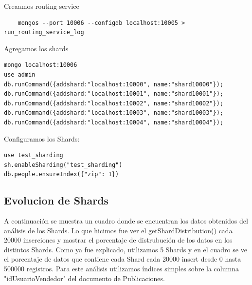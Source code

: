 \documentclass[a4paper, 10pt, twoside]{article}
\begin{document}
Creaamos routing service

\begin{verbatim}
    mongos --port 10006 --configdb localhost:10005 > run_routing_service_log
\end{verbatim}


Agregamos los shards

\begin{verbatim}
mongo localhost:10006
use admin
db.runCommand({addshard:"localhost:10000", name:"shard10000"});
db.runCommand({addshard:"localhost:10001", name:"shard10001"});
db.runCommand({addshard:"localhost:10002", name:"shard10002"});
db.runCommand({addshard:"localhost:10003", name:"shard10003"});
db.runCommand({addshard:"localhost:10004", name:"shard10004"});
\end{verbatim}

Configuramos los Shards:

\begin{verbatim}
use test_sharding
sh.enableSharding("test_sharding")
db.people.ensureIndex({"zip": 1})
\end{verbatim}

\subsection{Evolucion de Shards}

A continuaci\'on se muestra un cuadro donde se encuentran los datos obtenidos del an\'alisis de los Shards. Lo que hicimos fue ver el getShardDistribution() cada 20000 inserciones y mostrar el porcentaje de distrubuci\'on de los datos en los distintos Shards.
Como ya fue explicado, utilizamos 5 Shards y en el cuadro se ve el porcentaje de datos que contiene cada Shard cada 20000 insert desde 0 hasta 500000 registros.
Para este an\'alisis utilizamos \'indices simples sobre la columna "idUsuarioVendedor" del documento de Publicaciones.
\end{document}
